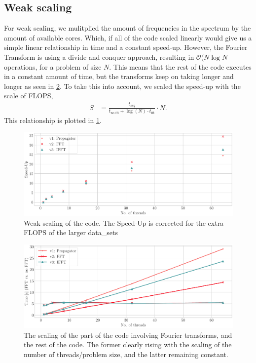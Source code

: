 \documentclass{article}
\begin{document}
\subsection{Weak scaling}
For weak scaling, we mulitplied the amount of frequencies in the spectrum by the amount of available cores. Which, if all of the code scaled linearly would give us a simple linear relationship in time and a constant speed-up. However, the Fourier Transform is using a divide and conquer approach, resulting in $\mathcal{O}(N\log N$ operations, for a problem of size $N$. This means that the rest of the code executes in a constant amount of time, but the transforms keep on taking longer and longer as seen in \cref{fig:fft_scaling}. To take this into account, we scaled the speed-up with the scale of FLOPS,
\begin{align}
    S &= \frac{t_{seq}}{t_\text{no fft} + \log(N) \cdot t_\text{fft}} \cdot N.
\end{align}
This relationship is plotted in \cref{fig:weak}.
\begin{figure}
    \centering
    \includegraphics[width=\textwidth]{./figures/weak_scaling_corrected.pdf}
    \caption{Weak scaling of the code. The Speed-Up is corrected for the extra FLOPS of the larger data_sets}
    \label{fig:weak}
\end{figure}

\begin{figure}
    \centering
    \includegraphics[width=\textwidth]{./figures/FFT_scaling.pdf}
    \caption{The scaling of the part of the code involving Fourier transforms, and the rest of the code. The former clearly rising with the scaling of the number of threads/problem size, and the latter remaining constant.}
    \label{fig:fft_scaling}
\end{figure}
\end{document}
